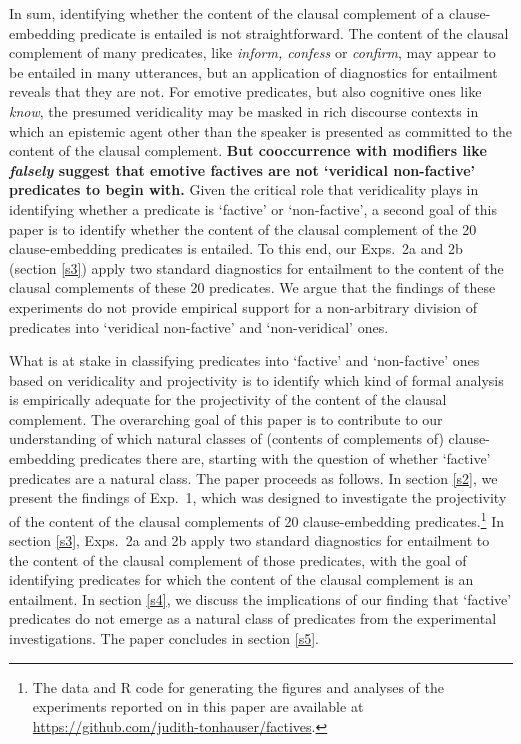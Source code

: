 \documentclass[11pt,fleqn]{article}
\newcommand{\6}{\mbox{$[\hspace*{-.6mm}[$}}
\newcommand{\9}{\mbox{$]\hspace*{-.6mm}]$}}
\begin{document}
In sum, identifying whether the content of the clausal complement of a clause-embedding predicate is entailed is not straightforward. The content of the clausal complement of many predicates, like {\em inform, confess} or {\em confirm}, may appear to be entailed in many utterances, but an application of diagnostics for entailment reveals that they are not. For emotive predicates, but also cognitive ones like {\em know}, the presumed veridicality may be masked in rich discourse contexts in which an epistemic agent other than the speaker is presented as committed to the content of the clausal complement. {\bf But cooccurrence with modifiers like {\em falsely} suggest that emotive factives are not `veridical non-factive' predicates to begin with.} Given the critical role that veridicality plays in identifying whether a predicate is `factive' or `non-factive', a second goal of this paper is to identify whether the content of the clausal complement of the 20 clause-embedding predicates is entailed. To this end, our Exps.~2a and 2b (section \ref{s3}) apply two standard diagnostics for entailment to the content of the clausal complements of these 20 predicates.  We argue that the findings of these experiments do not provide empirical support for a non-arbitrary division of predicates into `veridical non-factive' and `non-veridical' ones. 

What is at stake in classifying predicates into `factive' and `non-factive' ones based on veridicality and projectivity is to identify which kind of formal analysis is empirically adequate for the projectivity of the content of the clausal complement. The overarching goal of this paper is to contribute to our understanding of which natural classes of (contents of complements of) clause-embedding predicates there are, starting with the question of whether `factive' predicates are a natural class. The paper proceeds as follows. In section \ref{s2}, we present the findings of Exp.~1, which was designed to investigate the projectivity of the content of the clausal complements of 20 clause-embedding predicates.\footnote{\label{f-github}The
data and R code for generating the figures and analyses of the experiments reported on in this paper are available at \url{https://github.com/judith-tonhauser/factives}.}  In section \ref{s3}, Exps.~2a and 2b apply two standard diagnostics for entailment to the content of the clausal complement of those predicates, with the goal of identifying predicates for which the content of the clausal complement is an entailment. In section \ref{s4}, we discuss the implications of our finding that `factive' predicates do not emerge as a natural class of predicates from the experimental investigations. The paper concludes in section \ref{s5}.
\end{document}
